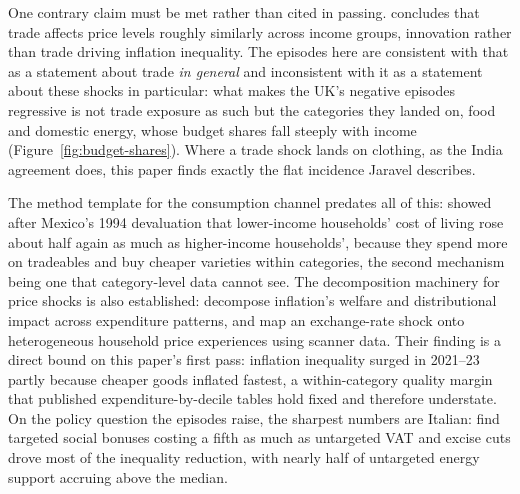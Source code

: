 \begin{sloppypar}
One contrary claim must be met rather than cited in passing.
\citet{jaravel2021} concludes that trade affects price levels roughly
similarly across income groups, innovation rather than trade driving
inflation inequality. The episodes here are consistent with that as a
statement about trade \emph{in general} and inconsistent with it as a
statement about these shocks in particular: what makes the UK's
negative episodes regressive is not trade exposure as such but the
categories they landed on, food and domestic energy, whose budget
shares fall steeply with income (Figure~\ref{fig:budget-shares}).
Where a trade shock lands on clothing, as the India agreement does,
this paper finds exactly the flat incidence Jaravel describes.

The method template for the consumption channel predates all of this:
\citet{cravinolevchenko2017} showed after Mexico's 1994 devaluation
that lower-income households' cost of living rose about half again as much
as higher-income households', because they spend more on tradeables and buy
cheaper varieties within categories, the second mechanism being one
that category-level data cannot see. The
decomposition machinery for price shocks is also established:
\citet{sologon2025} decompose inflation's welfare and distributional
impact across expenditure patterns, and \citet{chenlevell2024} map an
exchange-rate shock onto heterogeneous household price experiences
using scanner data. Their finding is a direct bound on this paper's
first pass: inflation inequality surged in 2021--23 partly because
cheaper goods inflated fastest, a within-category quality margin that
published expenditure-by-decile tables hold fixed and therefore
understate. On the policy question the episodes raise, the sharpest
numbers are Italian: \citet{curci2025} find targeted social bonuses
costing a fifth as much as untargeted VAT and excise cuts drove most of
the inequality reduction, with nearly half of untargeted energy support
accruing above the median.
\end{sloppypar}

